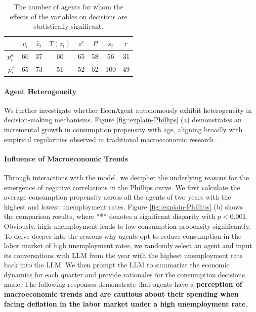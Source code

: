 \begin{table}[t]
\caption{The number of agents for whom the effects of the variables on decisions are statistically significant.}
    \centering
    \begin{tabular}{c|c|c|c|c|c|c|c}
    \toprule
     & $v_i$ & $\hat{c}_i$ & $T(z_i)$ & $z^r$ & $P$ & $s_i$ & $r$\\
    \hline
    $p^w_i$ & 60 & 37 & 60	& 65 & 58& 56& 31 \\
    $p^c_i$ & 65 & 73 & 51 & 52 & 62 & 100 & 49 \\
    \bottomrule
    \end{tabular}
    \label{table:num_agents}
\end{table}

\paragraph{Agent Heterogeneity}
We further investigate whether EconAgent autonomously exhibit heterogeneity in decision-making mechanisms. Figure \ref{fig::explain-Phillips} (a) demonstrates an incremental growth in consumption propensity with age, aligning broadly with empirical regularities observed in traditional macroeconomic research~\cite{carroll1997buffer}.

\paragraph{Influence of Macroeconomic Trends}
Through interactions with the model, we decipher the underlying reasons for the emergence of negative correlations in the Phillips curve. We first calculate the average consumption propensity across all the agents of two years with the highest and lowest unemployment rates. Figure \ref{fig::explain-Phillips} (b) shows the comparison results, where *** denotes a significant disparity with $p<0.001$. Obviously, high unemployment leads to low consumption propensity significantly. To delve deeper into the reasons why agents opt to reduce consumption in the labor market of high unemployment rates, we randomly select an agent and input its conversations with LLM from the year with the highest unemployment rate back into the LLM. We then prompt the LLM to summarize the economic dynamics for each quarter and provide rationales for the consumption decisions made. The following responses demonstrate that agents have a \textbf{perception of macroeconomic trends and are cautious about their spending when facing deflation in the labor market under a high unemployment rate}.


